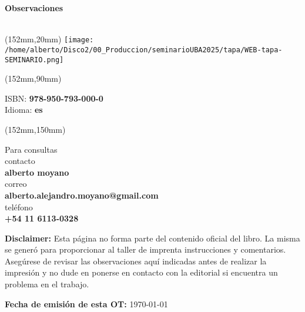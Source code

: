 \documentclass[11pt]{article}
\renewcommand{\normalsize}{\fontsize{11pt}{14.5pt}\selectfont}
\newcommand\subtitulo[1]{\sf\large{#1}}
\newcommand\texto[1]{\rm\normalsize{#1}}
\newcommand\foot[1]{\sf\footnotesize{#1}}
\begin{document}
\linespread{1.0}
\noindent \subtitulo{\textbf{Observaciones}}\\
\texto{}\\
\begin{textblock*}{44mm}(152mm,20mm)
\texttt{[image: /home/alberto/Disco2/00\_Produccion/seminarioUBA2025/tapa/WEB-tapa-SEMINARIO.png]}
\end{textblock*}
\begin{textblock*}{44mm}(152mm,90mm)
\begin{minipage}{44mm}
\noindent\foot{ISBN: \textbf{978-950-793-000-0}}\\
\noindent\foot{Idioma: \textbf{es}}\\
\end{minipage}
\end{textblock*}
\begin{textblock*}{44mm}(152mm,150mm)
\begin{minipage}{44mm}
\noindent \foot{Para consultas}\\
\noindent \foot{contacto}\\
\noindent \foot{\textbf{alberto moyano}}\\
\noindent \foot{correo}\\
\noindent \foot{\textbf{alberto.alejandro.moyano@gmail.com}}\\
\noindent \foot{teléfono}\\
\noindent \foot{\textbf{+54 11 6113-0328}}\\
\end{minipage}
\end{textblock*}
\vfill
\noindent\foot{\textbf{Disclaimer:} Esta página no forma parte del contenido oficial del libro. La misma se generó para proporcionar al taller de imprenta instrucciones y comentarios. Asegúrese de revisar las observaciones aquí indicadas antes de realizar la impresión y no dude en ponerse en contacto con la editorial si encuentra un problema en el trabajo.}

\noindent\foot{\textbf{Fecha de emisión de esta OT:} \today}
\end{document}
